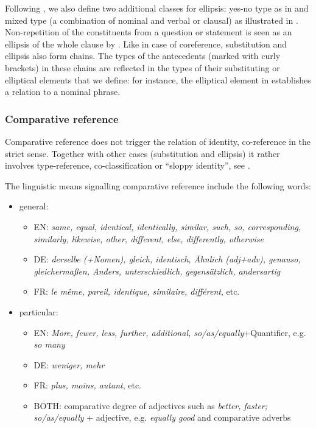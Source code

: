 \documentclass[a4paper]{article}
\begin{document}
Following \cite{Menzel2017}, we also define two additional classes for
ellipsis: yes-no type as in \Last[d] and mixed type (a combination of nominal
and verbal or clausal) as illustrated in \Last[e]. Non-repetition of the
constituents from a question or statement is seen as an ellipsis of the whole clause by \cite{HallidayHasan1976}. Like in case of coreference,
substitution and ellipsis also form chains. The types of the antecedents
(marked with curly brackets) in these chains are reflected in the types of
their substituting or elliptical elements that we define: for instance, the
elliptical element in \Last[a] establishes a relation to a nominal phrase.



\subsubsection{Comparative reference}\label{comp}

Comparative reference does not trigger the relation of identity, co-reference in the strict sense. Together with other cases (substitution and ellipsis) it rather involves type-reference, co-classification or ``sloppy identity'', see \cite{KunzSteiner2012}.

The linguistic means signalling comparative reference include the following words: 

\begin{itemize}
\item general: 
\begin{itemize}
\item EN: {\sl same, equal, identical, identically, similar, such, so, corresponding, similarly, likewise, other, different, else,
differently, otherwise}
\item DE: {\sl derselbe (+Nomen), gleich, identisch, Ähnlich (adj+adv), genauso, gleichermaßen, Anders, unterschiedlich, gegensätzlich, andersartig}
\item FR: \textsl{le même, pareil, identique, similaire, différent}, etc.
\end{itemize}
\item particular:

\begin{itemize}
\item EN: {\sl More, fewer, less, further, additional, so/as/equally}+Quantifier, e.g. {\sl so many}
\item DE: {\sl weniger, mehr}
\item FR: \textsl{plus, moins, autant}, etc.
\item BOTH: comparative degree of adjectives such as {\sl better, faster; so/as/equally} + 
adjective, e.g. {\sl equally good} and comparative adverbs
\end{itemize}
\end{itemize}
\end{document}

